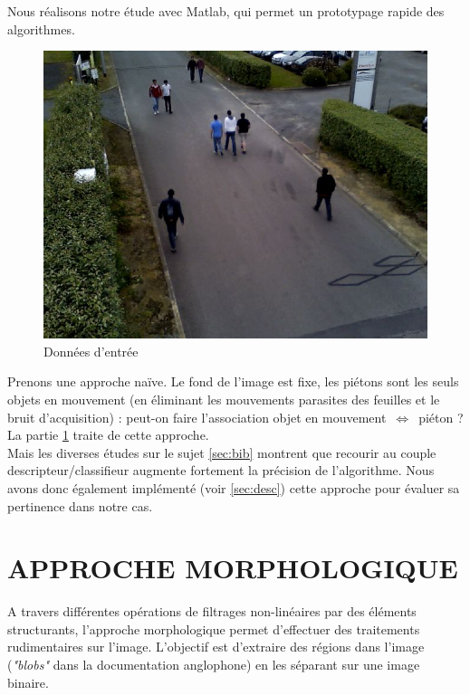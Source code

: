 \documentclass{article}
\begin{document}
	Nous réalisons notre étude avec Matlab, qui permet un prototypage rapide des algorithmes.\\
	
	\begin{figure}
		\begin{center}			
			\includegraphics[scale=0.3]{Img/detection_0156}
		\end{center}
		\caption{Données d'entrée}
	\end{figure}
	
	Prenons une approche naïve. Le fond de l'image est fixe, les piétons sont les seuls objets en mouvement (en éliminant les mouvements parasites des feuilles et le bruit d'acquisition) : peut-on faire l'association objet en mouvement~$\Leftrightarrow $~piéton ? La partie \ref{sec:morpho} traite de cette approche.
	\\
	
	Mais les diverses études sur le sujet \ref{sec:bib} montrent que recourir au couple descripteur/classifieur augmente fortement la précision de l'algorithme. Nous avons donc également implémenté (voir \ref{sec:desc}) cette approche pour évaluer sa pertinence dans notre cas.

\section{APPROCHE MORPHOLOGIQUE}
\label{sec:morpho}

	A travers différentes opérations de filtrages non-linéaires par des éléments structurants, l'approche morphologique permet d'effectuer des traitements rudimentaires sur l'image. L'objectif est d'extraire des régions dans l'image (\emph{"blobs"} dans la documentation anglophone) en les séparant sur une image binaire.
	
\end{document}
